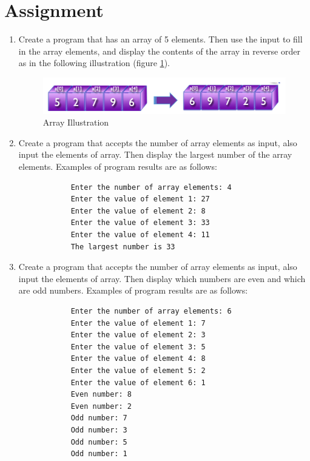 \documentclass[12pt,titlepage]{article}
\begin{document}
\section{Assignment}
\begin{enumerate}
    \item {
        Create a program that has an array of 5 elements. Then use the input to fill in
        the array elements, and display the contents of the array in reverse order as in the following illustration (figure \ref{array-illustration}).

        \begin{figure}[h]
            \centering
            \includegraphics[width=.8\textwidth]{./images/array-illustration.png}
            \caption{Array Illustration}
            \label{array-illustration}
        \end{figure}
    }
    \item {
        Create a program that accepts the number of array elements as input, also input the elements of array.
        Then display the largest number of the array elements. Examples of program results are as follows:

        \begin{verbatim}
            Enter the number of array elements: 4
            Enter the value of element 1: 27
            Enter the value of element 2: 8
            Enter the value of element 3: 33
            Enter the value of element 4: 11
            The largest number is 33
        \end{verbatim}
    }
    \item {
        Create a program that accepts the number of array elements as input, also input the elements of array.
        Then display which numbers are even and which are odd numbers. Examples of program results are as follows:

        \begin{verbatim}
            Enter the number of array elements: 6
            Enter the value of element 1: 7
            Enter the value of element 2: 3
            Enter the value of element 3: 5
            Enter the value of element 4: 8
            Enter the value of element 5: 2
            Enter the value of element 6: 1
            Even number: 8
            Even number: 2
            Odd number: 7
            Odd number: 3
            Odd number: 5
            Odd number: 1
        \end{verbatim}
    }
\end{enumerate}
\end{document}
